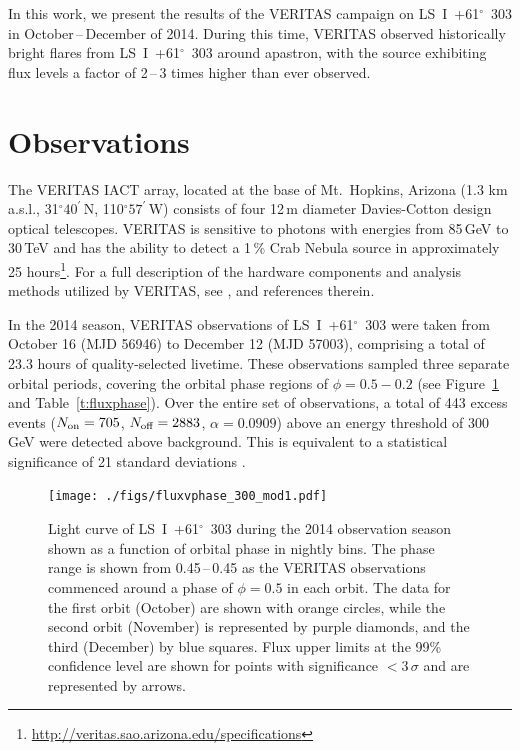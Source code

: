 \documentclass[preprint2]{aastex}
\newcommand{\lsi}{LS~I~+61$^{\circ}$~303}
\newcommand{\gev}{\,GeV}
\newcommand{\tev}{\,TeV}
\begin{document}
In this work, we present the results of the VERITAS campaign on \lsi{} in October\,--\,December of 2014. During this time, VERITAS observed historically bright flares from \lsi{} around apastron, with the source exhibiting flux levels a factor of 2\,--\,3 times higher than ever observed.

\section{Observations}
The VERITAS IACT array, located at the base of Mt.\ Hopkins, Arizona (1.3 km a.s.l., 31$^{\circ}40^\prime$\,N, 110$^{\circ}57^\prime$\,W) consists of four 12\,m diameter Davies-Cotton design optical telescopes. VERITAS is sensitive to photons with energies from 85\gev{} to 30\tev{} and has the ability to detect a 1\,\% Crab Nebula source in approximately 25 hours\footnote{\url{http://veritas.sao.arizona.edu/specifications}}. For a full description of the hardware components and analysis methods utilized by VERITAS, see \citet{VERITAS, KiedaVTSUpgrade, VERITASLSIDetection}, and references therein.

In the 2014 season, VERITAS observations of \lsi{} were taken from October 16 (MJD 56946) to  December 12 (MJD 57003), comprising a total of 23.3 hours of quality-selected livetime. These observations sampled three separate orbital periods, covering the orbital phase regions of $\phi = 0.5-0.2$ (see Figure~\ref{f:fluxphase} and Table~\ref{t:fluxphase}). Over the entire set of observations, a total of 443 excess events ($N_{\mbox{\scriptsize on}} = 705$, $N_{\mbox{\scriptsize off}} = 2883$, $\alpha = 0.0909$) above an energy threshold of 300\gev{} were detected above background. This is equivalent to a statistical significance of 21 standard deviations \citep[$21\sigma$, calculated using Equation 17 of][]{LiMa}.

\begin{figure}[ht]
\centering
\texttt{[image: ./figs/fluxvphase\_300\_mod1.pdf]}
\caption{Light curve of \lsi{} during the 2014 observation season shown as a function of orbital phase in nightly bins. %
The phase range is shown from 0.45\,--\,0.45 as the VERITAS observations commenced around a phase of $\phi=0.5$ in each orbit. The data for the first orbit (October) are shown with orange circles, while the second orbit (November) is represented by purple diamonds, and the third (December) by blue squares. Flux upper limits at the 99\% confidence level \citep[using the unbounded approach of][]{Rolke} are shown for points with significance $<3\,\sigma$ and are represented by arrows.
}
\label{f:fluxphase}
\end{figure}
\end{document}
